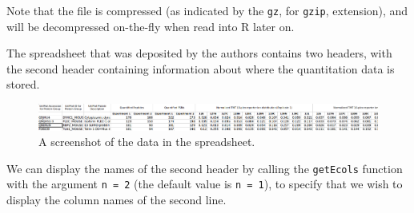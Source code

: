 Note that the file is compressed (as indicated by the \texttt{gz}, for
\texttt{gzip}, extension), and will be decompressed on-the-fly when read
into R later on.

The spreadsheet that was deposited by the authors contains two headers,
with the second header containing information about where the
quantitation data is stored.

\begin{figure}[htbp]
\centering
\includegraphics{./Figures/spreadsheet-screenshot.png}
\caption{A screenshot of the data in the spreadsheet.}
\end{figure}

We can display the names of the second header by calling the
\texttt{getEcols} function with the argument \texttt{n = 2} (the default
value is \texttt{n = 1}), to specify that we wish to display the column
names of the second line.

\begin{Shaded}
\begin{Highlighting}[]
 \NormalTok{, } \NormalTok{)}
\end{Highlighting}
\end{Shaded}

